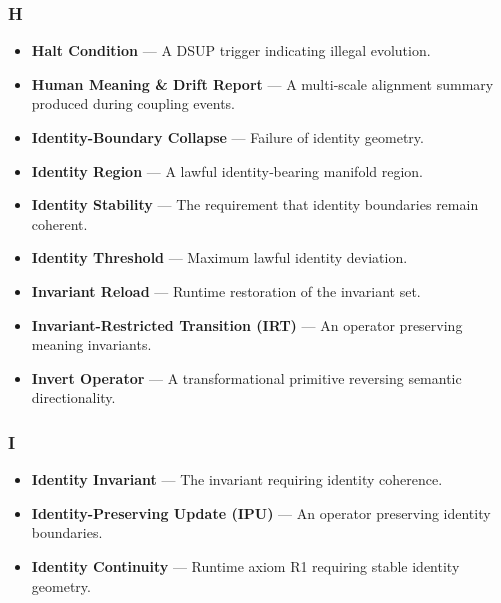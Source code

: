 \subsubsection*{H}
\begin{itemize}
    \item \textbf{Halt Condition} — A DSUP trigger indicating illegal evolution.

    \item \textbf{Human Meaning \& Drift Report} — A multi‑scale alignment
    summary produced during coupling events.

    \item \textbf{Identity-Boundary Collapse} — Failure of identity geometry.

    \item \textbf{Identity Region} — A lawful identity‑bearing manifold region.

    \item \textbf{Identity Stability} — The requirement that identity boundaries
    remain coherent.

    \item \textbf{Identity Threshold} — Maximum lawful identity deviation.

    \item \textbf{Invariant Reload} — Runtime restoration of the invariant set.

    \item \textbf{Invariant-Restricted Transition (IRT)} — An operator preserving
    meaning invariants.

    \item \textbf{Invert Operator} — A transformational primitive reversing
    semantic directionality.
\end{itemize}


\subsubsection*{I}
\begin{itemize}
    \item \textbf{Identity Invariant} — The invariant requiring identity
    coherence.

    \item \textbf{Identity-Preserving Update (IPU)} — An operator preserving
    identity boundaries.

    \item \textbf{Identity Continuity} — Runtime axiom R1 requiring stable
    identity geometry.
\end{itemize}


